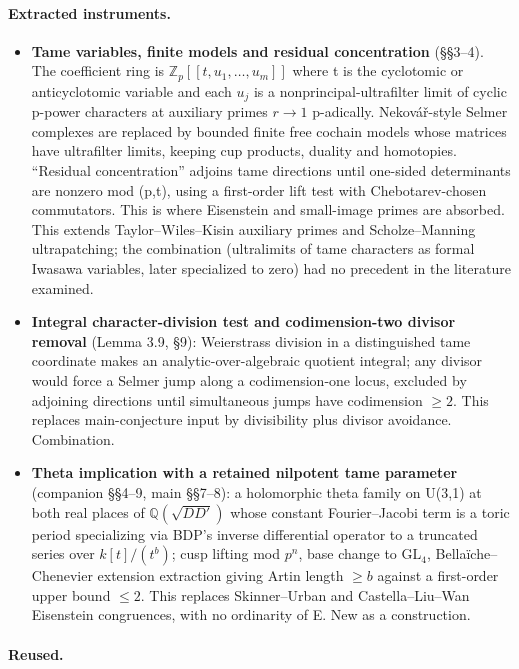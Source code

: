 \documentclass[11pt]{article}
\begin{document}
\paragraph{Extracted instruments.}

\begin{itemize}
\item \textbf{Tame variables, finite models and residual concentration} (\S{}\S{}3--4). The coefficient ring is $\mathbb Z_p[[t,u_1,\dots,u_m]]$ where t is the cyclotomic or anticyclotomic variable and each $u_j$ is a nonprincipal-ultrafilter limit of cyclic p-power characters at auxiliary primes $r\to1$ p-adically. Neková\v{r}-style Selmer complexes are replaced by bounded finite free cochain models whose matrices have ultrafilter limits, keeping cup products, duality and homotopies. ``Residual concentration'' adjoins tame directions until one-sided determinants are nonzero mod (p,t), using a first-order lift test with Chebotarev-chosen commutators. This is where Eisenstein and small-image primes are absorbed. This extends Taylor--Wiles--Kisin auxiliary primes and Scholze--Manning ultrapatching; the combination (ultralimits of tame characters as formal Iwasawa variables, later specialized to zero) had no precedent in the literature examined.
\item \textbf{Integral character-division test and codimension-two divisor removal} (Lemma 3.9, \S{}9): Weierstrass division in a distinguished tame coordinate makes an analytic-over-algebraic quotient integral; any divisor would force a Selmer jump along a codimension-one locus, excluded by adjoining directions until simultaneous jumps have codimension $\ge 2$. This replaces main-conjecture input by divisibility plus divisor avoidance. Combination.
\item \textbf{Theta implication with a retained nilpotent tame parameter} (companion \S{}\S{}4--9, main \S{}\S{}7--8): a holomorphic theta family on U(3,1) at both real places of $\mathbb Q(\sqrt{DD'})$ whose constant Fourier--Jacobi term is a toric period specializing via BDP's inverse differential operator to a truncated series over $k[t]/(t^b)$; cusp lifting mod $p^n$, base change to $\mathrm{GL}_{4}$, Bellaïche--Chenevier extension extraction giving Artin length $\ge b$ against a first-order upper bound $\le 2$. This replaces Skinner--Urban and Castella--Liu--Wan Eisenstein congruences, with no ordinarity of E. New as a construction.
\end{itemize}

\paragraph{Reused.}
\end{document}
